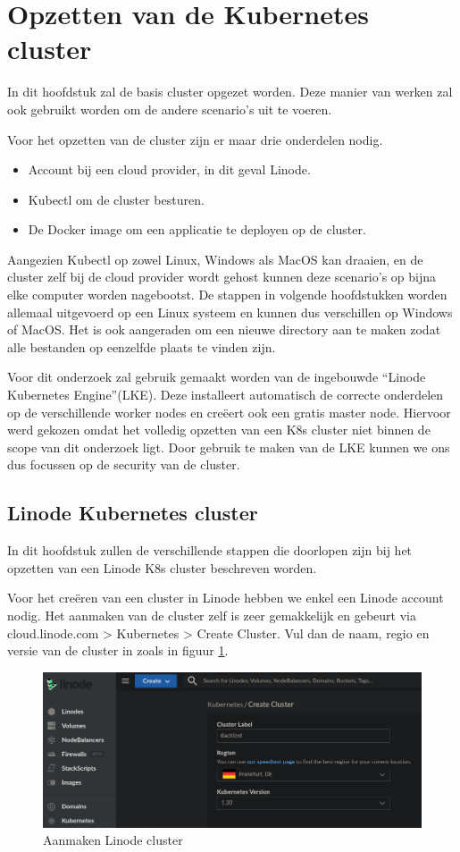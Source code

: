\section{Opzetten van de Kubernetes cluster}
In dit hoofdstuk zal de basis cluster opgezet worden. Deze manier van werken zal ook gebruikt worden om de andere scenario's uit te voeren.

Voor het opzetten van de cluster zijn er maar drie onderdelen nodig. 
\begin{itemize}
	\item Account bij een cloud provider, in dit geval Linode.
	\item Kubectl om de cluster besturen.
	\item De Docker image om een applicatie te deployen op de cluster.
\end{itemize}

Aangezien Kubectl op zowel Linux, Windows als MacOS kan draaien, en de cluster zelf bij de cloud provider wordt gehost kunnen deze scenario's op bijna elke computer worden nagebootst. De stappen in volgende hoofdstukken worden allemaal uitgevoerd op een Linux systeem en kunnen dus verschillen op Windows of MacOS. Het is ook aangeraden om een nieuwe directory aan te maken zodat alle bestanden op eenzelfde plaats te vinden zijn.

Voor dit onderzoek zal gebruik gemaakt worden van de ingebouwde ``Linode Kubernetes Engine''(LKE). Deze installeert automatisch de correcte onderdelen op de verschillende worker nodes en creëert ook een gratis master node. Hiervoor werd gekozen omdat het volledig opzetten van een K8s cluster niet binnen de scope van dit onderzoek ligt. Door gebruik te maken van de LKE kunnen we ons dus focussen op de security van de cluster. 

\subsection{Linode Kubernetes cluster}
In dit hoofdstuk zullen de verschillende stappen die doorlopen zijn bij het opzetten van een Linode K8s cluster beschreven worden.

Voor het creëren van een cluster in Linode hebben we enkel een Linode account nodig. Het aanmaken van de cluster zelf is zeer gemakkelijk en gebeurt via cloud.linode.com > Kubernetes > Create Cluster. Vul dan de naam, regio en versie van de cluster in zoals in figuur \ref{fig:LinodeNaam}.

\begin{figure}[h]
	\centering
	\includegraphics[width=\linewidth]{img/LinodeClusterNaam.png}
	\caption{Aanmaken Linode cluster}
	\label{fig:LinodeNaam}
\end{figure}

